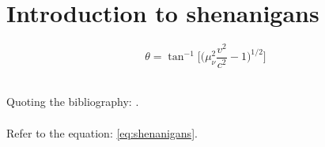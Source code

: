 \documentclass[1-ambra-tesi.tex]{subfiles}
\begin{document}
\label{sec:intro}

\begin{chapabstract}
\small{\lipsum[1]}\\

\begin{center}
    \noindent\makebox[0.8\linewidth]{\rule{0.8\paperwidth}{0.4pt}}
\end{center}
\vspace{2cm}
\end{chapabstract}

\lipsum[2]

\section{Introduction to shenanigans}
\label{sec:shenanigans}
\lipsum[3]
\lipsum[4]

\begin{equation}
    \theta = \tan^{-1} \Big[\Big(\mu_{\nu}^2 \frac{v^2}{c^2} -1 \Big)^{1/2}\Big]
\label{eq:shenanigans}
\end{equation}

\lipsum[5]\\


Quoting the bibliography: \cite{keyword}.\\


\lipsum[6]\\

Refer to the equation: \ref{eq:shenanigans}.\\

\lipsum[7]
\end{document}
